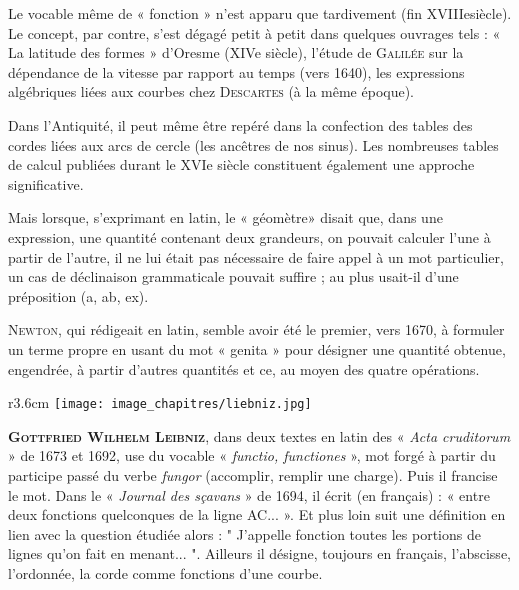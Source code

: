 
\begin{His}

Le  vocable même de «  fonction  »  n’est apparu que tardivement (fin   XVIIIesiècle). Le concept, par contre, s’est dégagé petit à petit dans quelques ouvrages tels : « La latitude des formes » d’Oresme (XIVe  siècle), l’étude de \textsc{Galilée} sur la  dépendance de la  vitesse  par  rapport au temps (vers 1640), les expressions algébriques liées    aux courbes chez \textsc{Descartes} (à la même époque).

\vspace{0.4cm}

Dans l’Antiquité, il peut même être repéré dans la  confection des tables des cordes  liées  aux arcs de cercle (les ancêtres de nos sinus). Les  nombreuses tables  de  calcul  publiées durant le XVIe siècle constituent également une approche significative. 

\vspace{0.4cm}
Mais  lorsque,  s’exprimant en latin,  le « géomètre» disait    que,    dans    une    expression,  une  quantité contenant  deux  grandeurs,  on  pouvait  calculer l’une à partir de l’autre, il ne lui était pas nécessaire de faire appel à un mot particulier, un   cas de déclinaison grammaticale pouvait suffire ; au plus usait-il d’une préposition (a, ab, ex). 

\textsc{Newton}, qui rédigeait en latin, semble avoir été le premier, vers 1670, à formuler un terme propre en usant du mot « genita » pour désigner une quantité obtenue, engendrée, à partir d’autres quantités et ce, au moyen des quatre opérations. 

\vspace{0.4cm}

\begin{wrapfigure}[15]{r}{3.6cm}
\vspace{-7mm}
\texttt{[image: image\_chapitres/liebniz.jpg]}
\end{wrapfigure}
\textbf{\textsc{Gottfried Wilhelm Leibniz}},  dans  deux  textes  en  latin  des  « \textit{Acta  cruditorum}  »  de  1673  et  1692,  use  du vocable  «  \textit{functio, functiones} », mot  forgé  à  partir  du  participe  passé  du  verbe \textit{fungor}   (accomplir,   remplir   une  
charge).  Puis  il  francise  le  mot.  Dans  le  « \textit{Journal des sçavans} » de 1694, il écrit (en   français)   :   «   entre   deux  fonctions   quelconques de la ligne AC... ». Et plus  loin  suit  une  définition  en  lien  avec  la  question    étudiée    alors    :  " J’appelle fonction  toutes  les  portions  de  lignes qu’on  fait  en  menant... ".  Ailleurs  il  désigne,  toujours  en  français,  l’abscisse,  l’ordonnée,  la  corde  comme  fonctions  d’une courbe.


\end{His}
